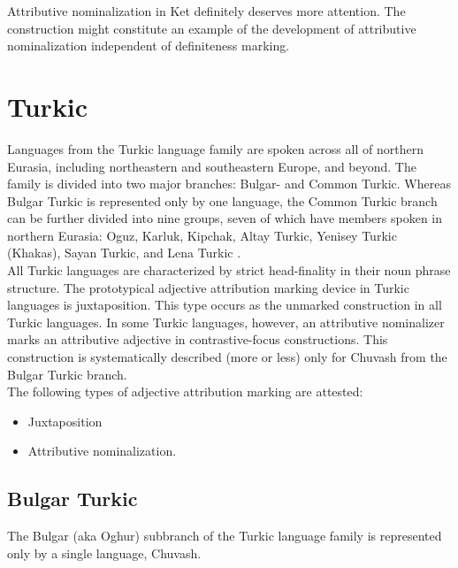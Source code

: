Attributive nominalization in Ket definitely deserves more attention. The construction might constitute an example of the development of attributive nominalization independent of definiteness marking.

\section{Turkic}
Languages from the Turkic language family are spoken across all of northern Eurasia, including northeastern and southeastern Europe, and beyond. The family is divided into two major branches: Bulgar- and Common Turkic. Where\-as Bulgar Turkic is represented only by one language, the Common Turkic branch can be further divided into nine groups, seven of which have members spoken in northern Eurasia: Oguz, Karluk, Kipchak, Altay Turkic, Yenisey Turkic (Khakas), Sayan Turkic, and Lena Turkic \cite[221]{salminen2007}.\\

\noindent All Turkic languages are characterized by strict head-finality in their noun phrase structure. The prototypical adjective attribution marking device in Turkic languages is juxtaposition. This type occurs as the unmarked construction in all Turkic languages. In some Turkic languages, however, an attributive nominalizer marks an attributive adjective in contrastive-focus constructions. This construction is systematically described (more or less) only for Chuvash from the Bulgar Turkic branch.\\

\noindent The following types of adjective attribution marking are attested:
\begin{itemize}
\item Juxtaposition
\item Attributive nominalization.
\end{itemize}

\subsection{Bulgar Turkic}
The Bulgar (aka Oghur) subbranch of the Turkic language family is represented only by a single language, Chuvash.

